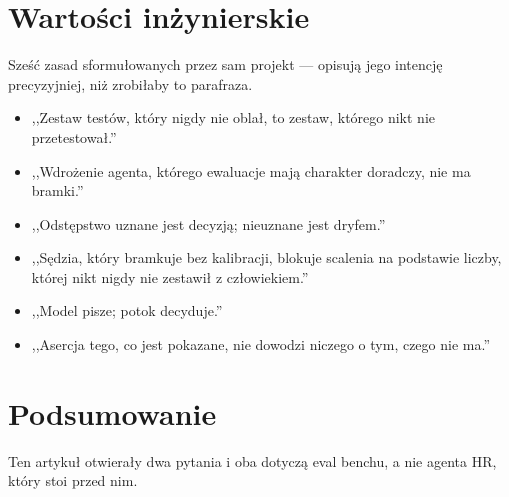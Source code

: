 \documentclass[11pt,a4paper]{article}
\begin{document}
\section{Wartości inżynierskie}

Sześć zasad sformułowanych przez sam projekt --- opisują jego intencję
precyzyjniej, niż zrobiłaby to parafraza.

\begin{itemize}[leftmargin=*]
    \item ,,Zestaw testów, który nigdy nie oblał, to zestaw, którego nikt nie
    przetestował.''
    \item ,,Wdrożenie agenta, którego ewaluacje mają charakter doradczy, nie ma
    bramki.''
    \item ,,Odstępstwo uznane jest decyzją; nieuznane jest dryfem.''
    \item ,,Sędzia, który bramkuje bez kalibracji, blokuje scalenia na podstawie
    liczby, której nikt nigdy nie zestawił z człowiekiem.''
    \item ,,Model pisze; potok decyduje.''
    \item ,,Asercja tego, co jest pokazane, nie dowodzi niczego o tym, czego nie
    ma.''
\end{itemize}

\section{Podsumowanie}

Ten artykuł otwierały dwa pytania i oba dotyczą eval benchu, a nie
agenta HR, który stoi przed nim.
\end{document}
